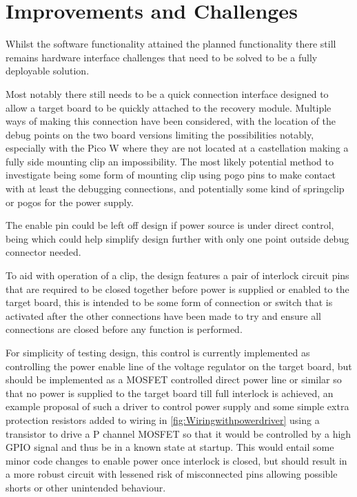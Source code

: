 \clearpage%
\vspace{21.5pt}
\chapter{Improvements and Challenges}

Whilst the software functionality attained the planned functionality there still remains hardware interface challenges that need to be solved to be a fully deployable solution.

Most notably there still needs to be a quick connection interface designed to allow a target board to be quickly attached to the recovery module. Multiple ways of making this connection have been considered, with the location of the debug points on the two board versions limiting the possibilities notably, especially with the Pico W where they are not located at a castellation making a fully side mounting clip an impossibility.  The most likely potential method to investigate being some form of mounting clip using pogo pins to make contact with at least the debugging connections, and potentially some kind of springclip or pogos for the power supply.

The enable pin could be left off design if power source is under direct control, being which could help simplify design further with only one point outside debug connector needed.

To aid with operation of a clip, the design features a pair of interlock circuit pins that are required to be closed together before power is supplied or enabled to the target board, this is intended to be some form of connection or switch that is activated after the other connections have been made to try and ensure all connections are closed before any function is performed.

 For simplicity of testing design, this control is currently implemented as controlling the power enable line of the voltage regulator on the target board, but should  be implemented as a MOSFET controlled direct power line or similar so that no power is supplied to the target board till full interlock is achieved, an example proposal of such a driver to control power supply and some simple extra protection resistors added to wiring in \autoref{fig:Wiringwithpowerdriver} using a transistor to drive a P channel MOSFET so that it would be controlled by a high GPIO signal and thus be in a known state at startup. This would entail some minor code changes to enable power once interlock is closed, but should result in a more robust circuit with lessened risk of misconnected pins allowing possible shorts or other unintended behaviour.


